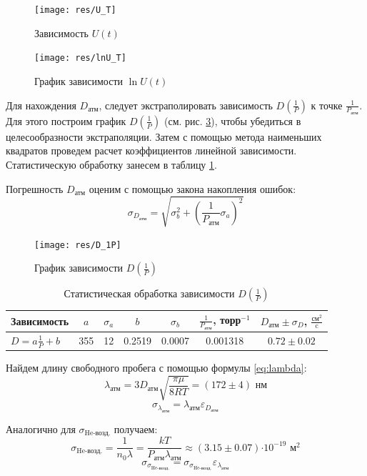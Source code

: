 \documentclass[12pt,a4paper]{article}
\newcommand{\e}[1]{\text{$\cdot10^{#1}$}}
\begin{document}
	
	
	\begin{figure}[H]
		\centering
		\texttt{[image: res/U\_T]}
		\caption{Зависимость $U(t)$}
		\label{fig:ut}
	\end{figure}
	
	\begin{figure}[H]
		\centering
		\texttt{[image: res/lnU\_T]}
		\caption{График зависимости $\ln{U}(t)$}
		\label{fig:lnut}
	\end{figure}
	
	
	Для нахождения $D_\text{атм}$, следует экстраполировать зависимость $D(\frac{1}{P})$ к точке $\frac{1}{P_\text{атм}}$. Для этого построим график $D(\frac{1}{P})$ (см. рис. \ref{fig:d1p}), чтобы убедиться в целесообразности экстраполяции. Затем с помощью метода наименьших квадратов проведем расчет коэффициентов линейной зависимости. Статистическую обработку занесем в таблицу \ref{tab:d1p}.
	
	Погрешность $D_\text{атм}$ оценим с помощью закона накопления ошибок:
	$$\sigma_{D_\text{атм}} = \sqrt{\sigma_b^2 + \left(\frac{1}{P_\text{атм}}\sigma_a\right)^2}$$
	
	
	
	
	\begin{figure}[H]
		\centering
		\texttt{[image: res/D\_1P]}
		\caption{График зависимости $D(\frac{1}{P})$}
		\label{fig:d1p}
	\end{figure}
	
	\begin{table}[H]
		\centering
		\caption{Статистическая обработка зависимости $D(\frac{1}{P})$}
		\label{tab:d1p}
		\footnotesize
		\begin{tabular}{lcccccc}
			\toprule
			Зависимость & $a$ & $\sigma_a$ & $b$ & $\sigma_b$ & $\frac{1}{P_\text{атм}}$, торр$^{-1}$ & $D_\text{атм}\pm\sigma_D$, $\frac{\text{см}^2}{\text{c}}$\\
			\midrule
			$D = a\frac{1}{P} + b$  &  355 & 12 &  0.2519 & 0.0007 & 0.001318 & $0.72\pm 0.02$ \\
			\bottomrule
		\end{tabular}
	\end{table}
	\clearpage
	Найдем длину свободного пробега с помощью формулы \ref{eq:lambda}:
	$$\lambda_{\text{атм}} = 3 D_\text{атм} \sqrt{\frac{\pi \mu}{8RT}} = (172 \pm 4) \text{ нм}$$
	$$\sigma_{\lambda_{\text{атм}}} = \lambda_{\text{атм}} \varepsilon_{D_\text{атм}}$$
	
	Аналогично для $\sigma_{\text{He-возд.}}$ получаем:
	$$\sigma_{\text{He-возд.}} = \frac{1}{n_0\lambda} = \frac{kT}{P_\text{атм}\lambda_{\text{атм}}} \approx (3.15 \pm 0.07)\e{-19} \text{ м}^2$$
	$$ \sigma_{\sigma_{\text{He-возд.}}} = \sigma_{\sigma_{\text{He-возд.}}}\varepsilon_{\lambda_{\text{атм}}}$$
\end{document}
